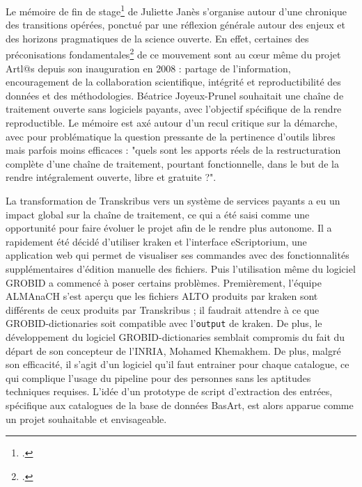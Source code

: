 \documentclass[a4paper,12pt,twoside]{book}
\begin{document}
Le mémoire de fin de stage\footcite{janesCataloguePapierAu2021} de Juliette Janès s'organise autour d'une chronique des transitions opérées, ponctué par une réflexion générale autour des enjeux et des horizons pragmatiques de la science ouverte. En effet, certaines des préconisations fondamentales\footcite{urfist_mediterranee_les_nodate, wilkinson_fair_2016, vanholsbeeck_la_2017} de ce mouvement sont au cœur même du projet Artl@s depuis son inauguration en 2008 : partage de l'information, encouragement de la collaboration scientifique, intégrité et reproductibilité des données et des méthodologies. Béatrice Joyeux-Prunel souhaitait une chaîne de traitement ouverte sans logiciels payants, avec l'objectif spécifique de la rendre reproductible. Le mémoire est axé autour d'un recul critique sur la démarche, avec pour problématique la question pressante de la pertinence d'outils libres mais parfois moins efficaces : "quels sont les apports réels de la restructuration complète d’une chaîne de traitement, pourtant fonctionnelle, dans le but de la rendre intégralement ouverte, libre et gratuite ?". 

La transformation de Transkribus vers un système de services payants a eu un impact global sur la chaîne de traitement, ce qui a été saisi comme une opportunité pour faire évoluer le projet afin de le rendre plus autonome. Il a rapidement été décidé d'utiliser kraken et l'interface eScriptorium, une application web qui permet de visualiser ses commandes avec des fonctionnalités supplémentaires d'édition manuelle des fichiers. Puis l'utilisation même du logiciel GROBID a commencé à poser certains problèmes. Premièrement, l'équipe ALMAnaCH s'est aperçu que les fichiers ALTO produits par kraken sont différents de ceux produits par Transkribus ; il faudrait attendre à ce que GROBID-dictionaries soit compatible avec l'\texttt{output} de kraken. De plus, le développement du logiciel GROBID-dictionaries semblait compromis du fait du départ de son concepteur de l'INRIA, Mohamed Khemakhem. De plus, malgré son efficacité, il s'agit d'un logiciel qu'il faut entrainer pour chaque catalogue, ce qui complique l'usage du pipeline pour des personnes sans les aptitudes techniques requises. L'idée d'un prototype de script d'extraction des entrées, spécifique aux catalogues de la base de données BasArt, est alors apparue comme un projet souhaitable et envisageable.
\end{document}
